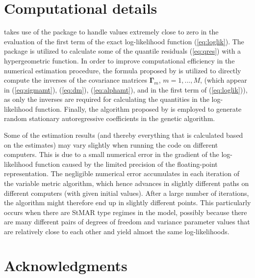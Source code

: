 \documentclass[nojss]{jss} %
\begin{document}
\section*{Computational details}


 takes use of the  package  \citep{Hankin:2007} to handle values extremely close to zero in the evaluation of the first term of the exact log-likelihood function (\ref{eq:loglik}). The package  \citep{Hankin:2006} is utilized to calculate some of the quantile residuals (\ref{eq:qres}) with a hypergeometric function. In order to improve computational efficiency in the numerical estimation procedure, the formula proposed by \cite{Galbraith+Galbraith:1974} is utilized to directly compute the inverses of the covariance matrices $\boldsymbol{\Gamma}_m$, $m=1,...,M$, (which appear in (\ref{eq:sigmamt}), (\ref{eq:dm}), (\ref{eq:alphamt}), and in the first term of (\ref{eq:loglik})), as only the inverses are required for calculating the quantities in the log-likelihood function. Finally, the algorithm proposed by \cite{Monahan:1984} is employed to generate random stationary autoregressive coefficients in the genetic algorithm.

Some of the estimation results (and thereby everything that is calculated based on the estimates) may vary slightly when running the code on different computers. This is due to a small numerical error in the gradient of the log-likelihood function caused by the limited precision of the floating-point representation. The negligible numerical error accumulates in each iteration of the variable metric algorithm, which hence advances in slightly different paths on different computers (with given initial values). After a large number of iterations, the algorithm might therefore end up in slightly different points. This particularly occurs when there are StMAR type regimes in the model, possibly because there are many different pairs of degrees of freedom and variance parameter values that are relatively close to each other and yield almost the same log-likelihoods.


\section*{Acknowledgments}
\end{document}
